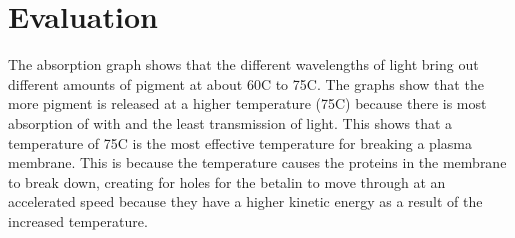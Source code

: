 \documentclass{thomasClass}
\begin{document}
\section{Evaluation}
The absorption graph shows that the different wavelengths of light bring out different amounts of pigment at about 60\textdegree C to 75\textdegree C. The graphs show that the more pigment is released at a higher temperature (75\textdegree C) because there is most absorption of with and the least transmission of light. This shows that a temperature of 75\textdegree C is the most effective temperature for breaking a plasma membrane. This is because the temperature causes the proteins in the membrane to break down, creating for holes for the betalin to move through at an accelerated speed because they have a higher kinetic energy as a result of the increased temperature.
\end{document}
